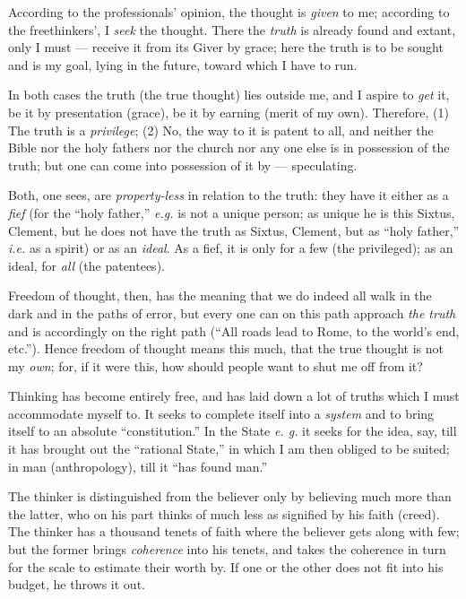 According to the professionals' opinion, the thought is \textit{given} to me; 
according to the freethinkers', I \textit{seek} the thought. There the 
\textit{truth} is already found and extant, only I must --- receive it from its 
Giver by grace; here the truth is to be sought and is my goal, lying in the 
future, toward which I have to run.

In both cases the truth (the true thought) lies outside me, and I aspire to 
\textit{get} it, be it by presentation (grace), be it by earning (merit of my 
own). Therefore, (1) The truth is a \textit{privilege}; (2) No, the way to it 
is patent to all, and neither the Bible nor the holy fathers nor the church 
nor any one else is in possession of the truth; but one can come into 
possession of it by --- speculating.

Both, one sees, are \textit{property-less} in relation to the truth: they have 
it either as a \textit{fief} (for the ``holy father,'' \textit{e.g.} is not 
a unique person; as unique he is this Sixtus, Clement, but he does not have 
the truth as Sixtus, Clement, but as ``holy father,'' \textit{i.e.} as a 
spirit) or as an \textit{ideal}. As a fief, it is only for a few (the 
privileged); as an ideal, for \textit{all} (the patentees).

Freedom of thought, then, has the meaning that we do indeed all walk in the 
dark and in the paths of error, but every one can on this path approach 
\textit{the truth} and is accordingly on the right path (``All roads lead to 
Rome, to the world's end, etc.''). Hence freedom of thought means this much, 
that the true thought is not my \textit{own}; for, if it were this, how should 
people want to shut me off from it?

Thinking has become entirely free, and has laid down a lot of truths which I 
must accommodate myself to. It seeks to complete itself into a \textit{system} 
and to bring itself to an absolute ``constitution.'' In the State \textit{e. 
g.} it seeks for the idea, say, till it has brought out the ``rational 
State,'' in which I am then obliged to be suited; in man (anthropology), till 
it ``has found man.''

The thinker is distinguished from the believer only by believing much more 
than the latter, who on his part thinks of much less as signified by his faith 
(creed). The thinker has a thousand tenets of faith where the believer gets 
along with few; but the former brings \textit{coherence} into his tenets, and 
takes the coherence in turn for the scale to estimate their worth by. If one 
or the other does not fit into his budget, he throws it out.


